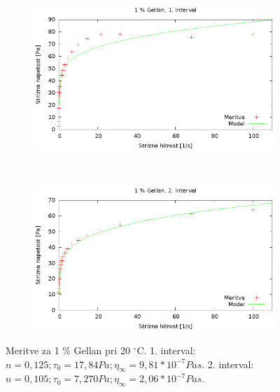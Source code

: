 \documentclass{article}
\begin{document}
\begin{figure}[H]
	\centering
	\begin{subfigure}[b]{0.45\textwidth}
	       \includegraphics[width=\textwidth]{tok_gel1.eps}
	   \end{subfigure}
	   ~
	   \begin{subfigure}[b]{0.45\textwidth}
	       \includegraphics[width=\textwidth]{tok_gel2.eps}
	   \end{subfigure}
	\caption{Meritve za 1 \% Gellan pri 20 $^\circ$C. 1. interval: $n = 0,125; \tau_0 = 17,84 Pa; \eta_\infty = 9,81*10^{-7} Pa s$. 2. interval: $n = 0,105; \tau_0 = 7,270 Pa; \eta_\infty = 2,06*10^{-7} Pa s$.}
	\label{fig:tok_gel1}
\end{figure}
\end{document}
